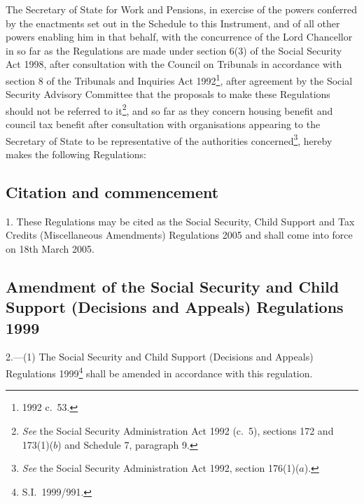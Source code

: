 \documentclass[12pt,a4paper]{article}
\title{\regstitle}
\author{S.I.\ 2005 No.\ 337}
\date{Made
15th February 2005\\
Laid before Parliament
18th February 2005\\
Coming into force
18th March 2005
}
\begin{document}
\maketitle

\noindent
The Secretary of State for Work and Pensions, in exercise of the powers conferred by the enactments set out in the Schedule to this Instrument, and of all other powers enabling him in that behalf, with the concurrence of the Lord Chancellor in so far as the Regulations are made under section 6(3) of the Social Security Act 1998, after consultation with the Council on Tribunals in accordance with section 8 of the Tribunals and Inquiries Act 1992\footnote{1992 c.\ 53.}, after agreement by the Social Security Advisory Committee that the proposals to make these Regulations should not be referred to it\footnote{\emph{See} the Social Security Administration Act 1992 (c.\ 5), sections 172 and 173(1)($b$)  and Schedule 7, paragraph 9.}, and so far as they concern housing benefit and council tax benefit after consultation with organisations appearing to the Secretary of State to be representative of the authorities concerned\footnote{\emph{See} the Social Security Administration Act 1992, section 176(1)($a$).}, hereby makes the following Regulations: 

{\sloppy

\tableofcontents

}

\bigskip

\setcounter{secnumdepth}{-2}

\subsection[1. Citation and commencement]{Citation and commencement}

1.  These Regulations may be cited as the Social Security, Child Support and Tax Credits (Miscellaneous Amendments) Regulations 2005 and shall come into force on 18th March 2005.

\subsection[2. Amendment of the Social Security and Child Support (Decisions and Appeals) Regulations 1999]{Amendment of the Social Security and Child Support (Decisions and Appeals) Regulations 1999}

2.---(1)  The Social Security and Child Support (Decisions and Appeals) Regulations 1999\footnote{S.I.\ 1999/991.} shall be amended in accordance with this regulation.
\end{document}
